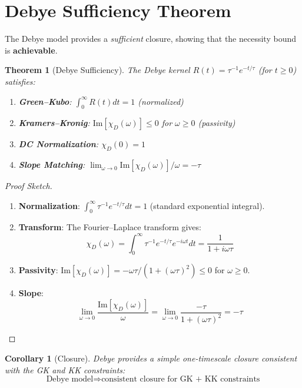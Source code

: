 \documentclass[11pt]{article}
\newtheorem{theorem}{Theorem}
\newtheorem{corollary}{Corollary}
\begin{document}
\section{Debye Sufficiency Theorem}

The Debye model provides a \emph{sufficient} closure, showing that the necessity bound is \textbf{achievable}.

\begin{theorem}[Debye Sufficiency]
The Debye kernel $R(t) = \tau^{-1} e^{-t/\tau}$ (for $t \geq 0$) satisfies:
\begin{enumerate}
\item \textbf{Green--Kubo}: $\int_0^\infty R(t) dt = 1$ (normalized)
\item \textbf{Kramers--Kronig}: $\text{Im}[\chi_D(\omega)] \leq 0$ for $\omega \geq 0$ (passivity)
\item \textbf{DC Normalization}: $\chi_D(0) = 1$
\item \textbf{Slope Matching}: $\lim_{\omega \to 0} \text{Im}[\chi_D(\omega)]/\omega = -\tau$
\end{enumerate}
\end{theorem}

\begin{proof}[Proof Sketch]
\begin{enumerate}
\item \textbf{Normalization}: $\int_0^\infty \tau^{-1} e^{-t/\tau} dt = 1$ (standard exponential integral).

\item \textbf{Transform}: The Fourier--Laplace transform gives:
\[
\chi_D(\omega) = \int_0^\infty \tau^{-1} e^{-t/\tau} e^{-i\omega t} dt = \frac{1}{1 + i\omega\tau}
\]

\item \textbf{Passivity}: $\text{Im}[\chi_D(\omega)] = -\omega\tau/(1 + (\omega\tau)^2) \leq 0$ for $\omega \geq 0$.

\item \textbf{Slope}: 
\[
\lim_{\omega \to 0} \frac{\text{Im}[\chi_D(\omega)]}{\omega} = \lim_{\omega \to 0} \frac{-\tau}{1 + (\omega\tau)^2} = -\tau
\]
\end{enumerate}
\end{proof}

\begin{corollary}[Closure]
Debye provides a simple one-timescale closure consistent with the GK and KK constraints:
\[
\text{Debye model} \Longrightarrow \text{consistent closure for GK + KK constraints}
\]
\end{corollary}
\end{document}
